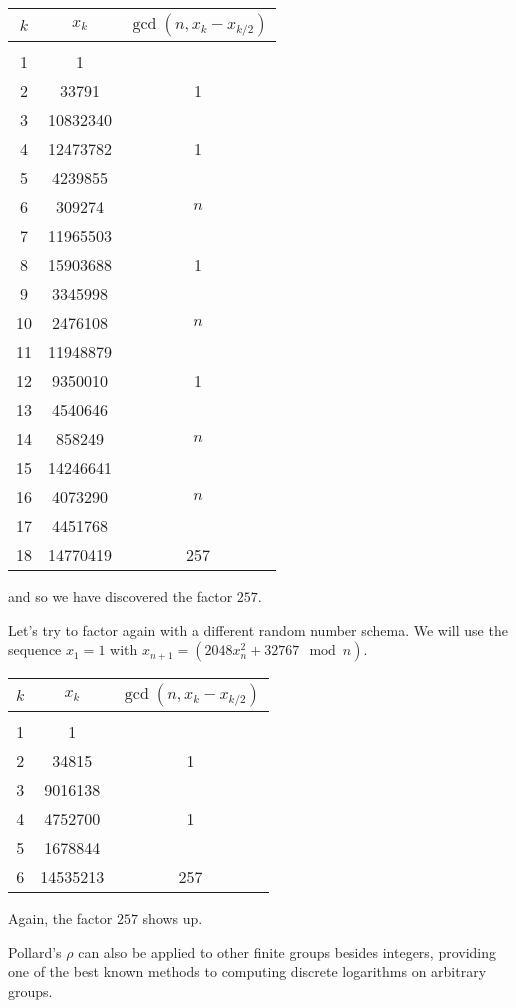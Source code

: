 \documentclass[12pt]{article}
\begin{document}
\begin{center}
\begin{tabular}{ccc}
$k$ & $x_k$ & $\gcd( n, x_k - x_{k/2} )$ \\
\hline \\
1 & 1 & \\
2 & 33791 & 1 \\
3 & 10832340 & \\
4 & 12473782 & 1 \\
5 & 4239855 & \\
6 & 309274 & $n$ \\
7 & 11965503 & \\
8 & 15903688 & 1 \\
9 & 3345998 & \\
10 & 2476108 & $n$ \\
11 & 11948879 & \\
12 & 9350010 & 1 \\
13 & 4540646 & \\
14 & 858249 & $n$ \\
15 & 14246641 & \\
16 & 4073290 & $n$ \\
17 & 4451768 & \\
18 & 14770419 & 257 \\
\end{tabular}
\end{center}
and so we have discovered the factor $257$. 

Let's try to factor again with a different random number schema.
We will use the sequence $x_1=1$ with $x_{n+1} = ( 2048x_n^2 +
32767 \mod n )$.

\begin{center}
\begin{tabular}{ccc}
$k$ & $x_k$ & $\gcd( n, x_k - x_{k/2} )$ \\
\hline \\
1 & 1 & \\
2 & 34815 & 1 \\
3 & 9016138 & \\
4 & 4752700 & 1 \\
5 & 1678844 & \\
6 & 14535213 & 257 \\
\end{tabular}
\end{center}
Again, the factor $257$ shows up.

Pollard's $\rho$ can also be applied to other finite groups besides integers,  providing one of the best known methods to computing discrete logarithms on arbitrary groups.
\end{document}
